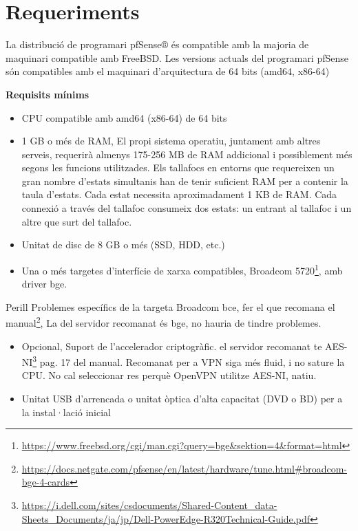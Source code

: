 \documentclass[
  10pt,
]{krantz}
\DeclareRobustCommand{\href}[2]{#2\footnote{\url{#1}}}
\begin{document}
\hypertarget{requeriments}{%
\section{Requeriments}\label{requeriments}}

La distribució de programari pfSense® és compatible amb la majoria de maquinari compatible amb FreeBSD. Les versions actuals del programari pfSense són compatibles amb el maquinari d'arquitectura de 64 bits (amd64, x86-64)

\textbf{Requisits mínims}

\begin{itemize}
\item
  CPU compatible amb amd64 (x86-64) de 64 bits
\item
  1 GB o més de RAM, El propi sistema operatiu, juntament amb altres serveis, requerirà almenys 175-256 MB de RAM addicional i possiblement més segons les funcions utilitzades. Els tallafocs en entorns que requereixen un gran nombre d'estats simultanis han de tenir suficient RAM per a contenir la taula d'estats. Cada estat necessita aproximadament 1 KB de RAM. Cada connexió a través del tallafoc consumeix dos estats: un entrant al tallafoc i un altre que surt del tallafoc.
\item
  Unitat de disc de 8 GB o més (SSD, HDD, etc.)
\item
  Una o més targetes d'interfície de xarxa compatibles, \href{https://www.freebsd.org/cgi/man.cgi?query=bge\&sektion=4\&format=html}{Broadcom 5720}, amb driver bge.
\end{itemize}

\begin{rmdwarn}{Perill}
Problemes específics de la targeta Broadcom bce, fer el que recomana el \href{https://docs.netgate.com/pfsense/en/latest/hardware/tune.html\#broadcom-bge-4-cards}{manual}, La del servidor recomanat és bge, no hauria de tindre problemes.

\end{rmdwarn}

\begin{itemize}
\item
  Opcional, Suport de l'accelerador criptogràfic. el servidor recomanat te \href{https://i.dell.com/sites/csdocuments/Shared-Content_data-Sheets_Documents/ja/jp/Dell-PowerEdge-R320Technical-Guide.pdf}{AES-NI} pag. 17 del manual. Recomanat per a VPN siga més fluid, i no sature la CPU. No cal seleccionar res perquè OpenVPN utilitze AES-NI, natiu.
\item
  Unitat USB d'arrencada o unitat òptica d'alta capacitat (DVD o BD) per a la instal·lació inicial
\end{itemize}
\end{document}
